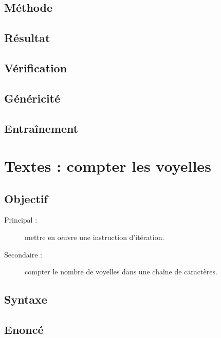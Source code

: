 \subsection{Méthode}\label{boucles:jeux:methode}

\subsection{Résultat}\label{boucles:jeux:resultat}

\subsection{Vérification}\label{boucles:jeux:verification}

\subsection{Généricité}\label{boucles:jeux:genericite}

\subsection{Entraînement}\label{boucles:jeux:entrainement}


\section{Textes : compter les voyelles}\label{boucles:textes}

\subsection{Objectif}\label{boucles:textes:objectif}
\begin{description}
\item[Principal : ] mettre en \oe uvre une instruction d'itération.
\item[Secondaire :] compter le nombre de voyelles dans une chaîne de caractères.
\end{description}

\subsection{Syntaxe \python}\label{boucles:textes:python}

\subsection{Enoncé}\label{boucles:textes:enonce}

